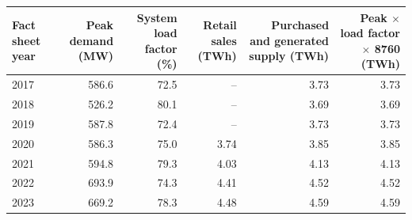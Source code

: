 \begin{tabular}{lrrrrr}
\toprule
Fact sheet year & Peak demand (MW) & System load factor (\%) & Retail sales (TWh) & Purchased and generated supply (TWh) & Peak $\times$ load factor $\times$ 8760 (TWh) \\
\midrule
2017 & 586.6 & 72.5 & -- & 3.73 & 3.73 \\
2018 & 526.2 & 80.1 & -- & 3.69 & 3.69 \\
2019 & 587.8 & 72.4 & -- & 3.73 & 3.73 \\
2020 & 586.3 & 75.0 & 3.74 & 3.85 & 3.85 \\
2021 & 594.8 & 79.3 & 4.03 & 4.13 & 4.13 \\
2022 & 693.9 & 74.3 & 4.41 & 4.52 & 4.52 \\
2023 & 669.2 & 78.3 & 4.48 & 4.59 & 4.59 \\
\bottomrule
\end{tabular}